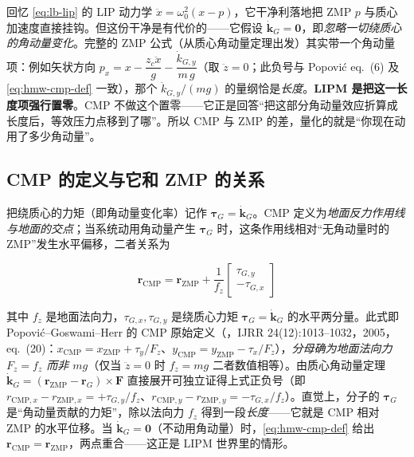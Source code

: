 \begin{insight}\label{ins:hmw-lipm-assumption}
回忆 \cref{eq:lb-lip} 的 LIP 动力学 $\ddot x=\omega_0^2(x-p)$，它干净利落地把 ZMP $p$ 与质心加速度直接挂钩。但这份干净是有代价的——它假设 $\dot{\mathbf k}_G=\mathbf 0$，即\emph{忽略一切绕质心的角动量变化}。完整的 ZMP 公式（从质心角动量定理出发）其实带一个角动量项：例如矢状方向 $p_x=x-\dfrac{z_c\ddot x}{g}-\dfrac{\dot k_{G,y}}{m\,g}$（取 $\ddot z=0$；此负号与 Popović eq.~(6) 及 \cref{eq:hmw-cmp-def} 一致），那个 $\dot k_{G,y}/(mg)$ 的量纲恰是\emph{长度}。\textbf{LIPM 是把这一长度项强行置零}。CMP 不做这个置零——它正是回答“把这部分角动量效应折算成长度后，等效压力点移到了哪”。所以 CMP 与 ZMP 的差，量化的就是“你现在动用了多少角动量”。
\end{insight}

\subsection{CMP 的定义与它和 ZMP 的关系}
\label{subsec:hmw-cmp-def}

把绕质心的力矩（即角动量变化率）记作 $\boldsymbol\tau_G=\dot{\mathbf k}_G$。CMP 定义为\emph{地面反力作用线与地面的交点}；当系统动用角动量产生 $\boldsymbol\tau_G$ 时，这条作用线相对“无角动量时的 ZMP”发生水平偏移，二者关系为

\begin{equation}
  \boxed{\;\mathbf r_{\mathrm{CMP}}=\mathbf r_{\mathrm{ZMP}}+\frac{1}{f_z}\begin{bmatrix}\tau_{G,y}\\[2pt]-\tau_{G,x}\end{bmatrix}\;}
  \label{eq:hmw-cmp-def}
\end{equation}

其中 $f_z$ 是地面法向力，$\tau_{G,x},\tau_{G,y}$ 是绕质心力矩 $\boldsymbol\tau_G=\dot{\mathbf k}_G$ 的水平两分量。此式即 Popović–Goswami–Herr 的 CMP 原始定义（\cite{popovic2005cmp}，IJRR 24(12):1013–1032，2005，eq.~(20)：$x_{\mathrm{CMP}}=x_{\mathrm{ZMP}}+\tau_y/F_z$、$y_{\mathrm{CMP}}=y_{\mathrm{ZMP}}-\tau_x/F_z$），\emph{分母确为地面法向力 $F_z=f_z$ 而非 $mg$}（仅当 $\ddot z=0$ 时 $f_z=mg$ 二者数值相等）。由质心角动量定理 $\dot{\mathbf k}_G=(\mathbf r_{\mathrm{ZMP}}-\mathbf r_G)\times\mathbf F$ 直接展开可独立证得上式正负号（即 $r_{\mathrm{CMP},x}-r_{\mathrm{ZMP},x}=+\tau_{G,y}/f_z$、$r_{\mathrm{CMP},y}-r_{\mathrm{ZMP},y}=-\tau_{G,x}/f_z$）。直觉上，分子的 $\boldsymbol\tau_G$ 是“角动量贡献的力矩”，除以法向力 $f_z$ 得到一段\emph{长度}——它就是 CMP 相对 ZMP 的水平位移。当 $\dot{\mathbf k}_G=\mathbf 0$（不动用角动量）时，\cref{eq:hmw-cmp-def} 给出 $\mathbf r_{\mathrm{CMP}}=\mathbf r_{\mathrm{ZMP}}$，两点重合——这正是 LIPM 世界里的情形。

